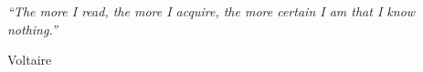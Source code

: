 \pagestyle{empty} %

\null\vfill %


\textit{``The more I read, the more I acquire, the more certain I am that I know nothing.''}

\begin{flushright}
Voltaire
\end{flushright}

\vfill\vfill\vfill\vfill\vfill\vfill\null %

\clearpage %